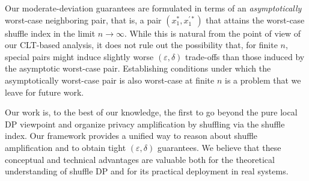 \documentclass{article}
\theoremstyle{plain}
\theoremstyle{definition}
\begin{document}
Our moderate-deviation guarantees are formulated in terms of an \emph{asymptotically} worst-case neighboring pair, that is, a pair $(x_1^\ast,x_1^{\prime\ast})$ that attains the worst-case shuffle index in the limit $n\to\infty$.
While this is natural from the point of view of our CLT-based analysis, it does not rule out the possibility that, for finite $n$, special pairs might induce slightly worse $(\varepsilon,\delta)$ trade-offs than those induced by the asymptotic worst-case pair.
Establishing conditions under which the asymptotically worst-case pair is also worst-case at finite $n$ is a problem that we leave for future work.


Our work is, to the best of our knowledge, the first to go beyond the pure local DP viewpoint and organize privacy amplification by shuffling via the shuffle index.
Our framework provides a unified way to reason about shuffle amplification and to obtain tight $(\varepsilon,\delta)$ guarantees.
We believe that these conceptual and technical advantages are valuable both for the theoretical understanding of shuffle DP and for its practical deployment in real systems.










\appendix





\end{document}
